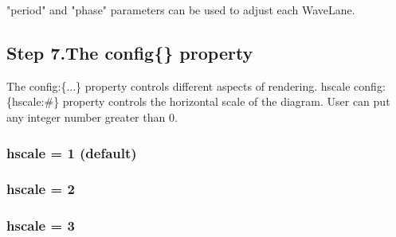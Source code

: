 \documentclass{article}
\begin{document}
"period" and "phase" parameters can be used to adjust each WaveLane. 




\begin{tikzpicture}[thick]
    
\end{tikzpicture}

\subsection{ Step 7.The config\{\} property}

The config:\{...\} property controls different aspects of rendering.
hscale
config:\{hscale:\#\} property controls the horizontal scale of the diagram. User can put any integer number greater than 0. 



\subsubsection{ hscale = 1 (default) }
\begin{tikzpicture}[thick]
    
\end{tikzpicture}

\subsubsection{ hscale = 2 }
\begin{tikzpicture}[thick]
    
\end{tikzpicture}

\subsubsection{ hscale = 3 }
\begin{tikzpicture}[thick]
    
\end{tikzpicture}
\end{document}
